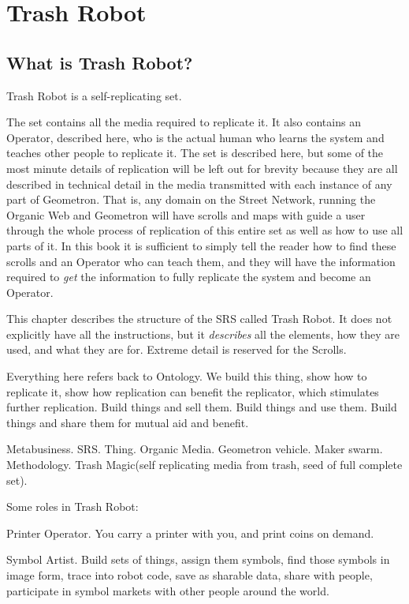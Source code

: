 \section{Trash Robot}

\subsection{What is Trash Robot?}

Trash Robot is a self-replicating set. 

The set contains all the media required to replicate it.  It also contains an Operator, described here, who is the actual human who learns the system and teaches other people to replicate it.  The set is described here, but some of the most minute details of replication will be left out for brevity because they are all described in technical detail in the media transmitted with each instance of any part of Geometron.  That is, any domain on the Street Network, running the Organic Web and Geometron will have scrolls and maps with guide a user through the whole process of replication of this entire set as well as how to use all parts of it.  In this book it is sufficient to simply tell the reader how to find these scrolls and an Operator who can teach them, and they will have the information required to \emph{get} the information to fully replicate the system and become an Operator.


This chapter describes the structure of the SRS called Trash Robot.  It does not explicitly have all the instructions, but it \emph{describes} all the elements, how they are used, and what they are for.  Extreme detail is reserved for the Scrolls.

Everything here refers back to Ontology.  We build this thing, show how to replicate it, show how replication can benefit the replicator, which stimulates further replication.  Build things and sell them. Build things and use them. Build things and share them for mutual aid and benefit. 

Metabusiness.  SRS.  Thing.  Organic Media. Geometron vehicle.  Maker swarm. Methodology.  Trash Magic(self replicating media from trash, seed of full complete set).


Some roles in Trash Robot:

Printer Operator.  You carry a printer with you, and print coins on demand.

Symbol Artist.  Build sets of things, assign them symbols, find those symbols in image form, trace into robot code, save as sharable data, share with people, participate in symbol markets with other people around the world. 

